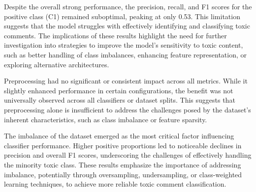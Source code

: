 Despite the overall strong performance, the precision, recall, and F1 scores for the positive class (C1) remained suboptimal, peaking at only 0.53. This limitation suggests that the model struggles with effectively identifying and classifying toxic comments. The implications of these results highlight the need for further investigation into strategies to improve the model's sensitivity to toxic content, such as better handling of class imbalances, enhancing feature representation, or exploring alternative architectures.

Preprocessing had no significant or consistent impact across all metrics. While it slightly enhanced performance in certain configurations, the benefit was not universally observed across all classifiers or dataset splits. This suggests that preprocessing alone is insufficient to address the challenges posed by the dataset's inherent characteristics, such as class imbalance or feature sparsity.

The imbalance of the dataset emerged as the most critical factor influencing classifier performance. Higher positive proportions led to noticeable declines in precision and overall F1 scores, underscoring the challenges of effectively handling the minority toxic class. These results emphasize the importance of addressing imbalance, potentially through oversampling, undersampling, or class-weighted learning techniques, to achieve more reliable toxic comment classification.
